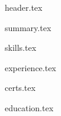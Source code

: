 \documentclass[11pt, a4paper]{extarticle}
\begin{document}
	{header.tex}

	{summary.tex}

	{skills.tex}

	{experience.tex}

	{certs.tex}

	{education.tex}
\end{document}
